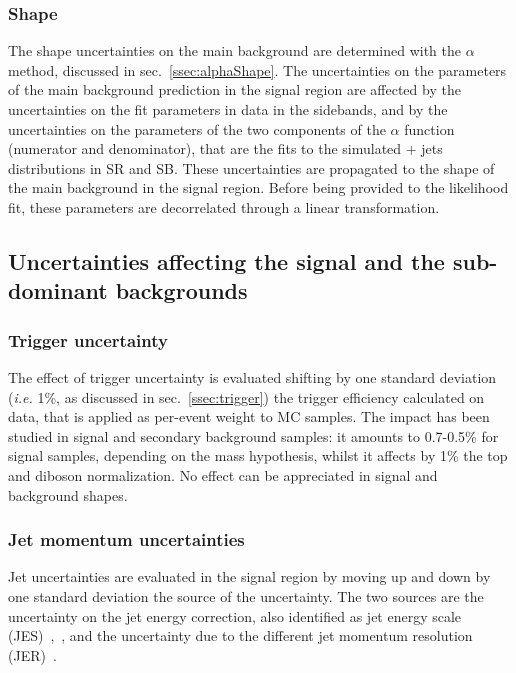 \subsubsection{Shape}

The shape uncertainties on the main background are determined with the $\alpha$ method, discussed in sec.~\ref{ssec:alphaShape}. The uncertainties on the parameters of the main background prediction in the signal region are affected by the uncertainties on the fit parameters in data in the sidebands, and by the uncertainties on the parameters of the two components of the $\alpha$ function (numerator and denominator), that are the \mtVZ fits to the simulated \V + jets distributions in SR and SB. These uncertainties are propagated to the shape of the main background in the signal region. Before being provided to the likelihood fit, these parameters are decorrelated through a linear transformation.

\subsection{Uncertainties affecting the signal and the sub-dominant backgrounds}

\subsubsection{Trigger uncertainty}

The effect of trigger uncertainty is evaluated shifting by one standard deviation (\textit{i.e.} 1\%, as discussed in sec.~\ref{ssec:trigger}) the \MET trigger efficiency calculated on data, that is applied as per-event weight to MC samples. The impact has been studied in signal and secondary background samples: it amounts to 0.7-0.5\% for signal samples, depending on the mass hypothesis, whilst it affects by 1\% the top and diboson normalization. No effect can be appreciated in signal and background shapes.

\subsubsection{Jet momentum uncertainties}

Jet uncertainties are evaluated in the signal region by moving up and down by one standard deviation the source of the uncertainty. The two sources are the uncertainty on the jet energy correction, also identified as jet energy scale (JES)~\cite{bib:1748-0221-6-11-P11002},~\cite{CMS-DP-2016-020}, and the uncertainty due to the different jet momentum resolution (JER)~\cite{CMS-DP-2016-020}.

